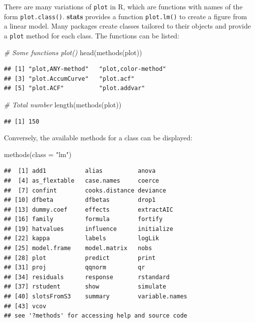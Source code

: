 \documentclass[
  12pt,
  american,
  a4paper,
  extrafontsizes,onecolumn,openright
  ]{memoir}
\newenvironment{Shaded}{\begin{snugshade}}{\end{snugshade}}
\newcommand{\AttributeTok}[1]{\textcolor[rgb]{0.77,0.63,0.00}{#1}}
\newcommand{\CommentTok}[1]{\textcolor[rgb]{0.56,0.35,0.01}{\textit{#1}}}
\newcommand{\FunctionTok}[1]{\textcolor[rgb]{0.00,0.00,0.00}{#1}}
\newcommand{\NormalTok}[1]{#1}
\newcommand{\StringTok}[1]{\textcolor[rgb]{0.31,0.60,0.02}{#1}}
\begin{document}
\normalsize

There are many variations of \texttt{plot} in R, which are functions with names of the form \texttt{plot.class()}.
\textbf{stats} provides a function \texttt{plot.lm()} to create a figure from a linear model.
Many packages create classes tailored to their objects and provide a \texttt{plot} method for each class.
The functions can be listed:

\scriptsize

\begin{Shaded}
\begin{Highlighting}[]
\CommentTok{\# Some functions plot()}
\FunctionTok{head}\NormalTok{(}\FunctionTok{methods}\NormalTok{(plot))}
\end{Highlighting}
\end{Shaded}

\begin{verbatim}
## [1] "plot,ANY-method"   "plot,color-method"
## [3] "plot.AccumCurve"   "plot.acf"         
## [5] "plot.ACF"          "plot.addvar"
\end{verbatim}

\begin{Shaded}
\begin{Highlighting}[]
\CommentTok{\# Total number}
\FunctionTok{length}\NormalTok{(}\FunctionTok{methods}\NormalTok{(plot))}
\end{Highlighting}
\end{Shaded}

\begin{verbatim}
## [1] 150
\end{verbatim}

\normalsize

Conversely, the available methods for a class can be displayed:

\scriptsize

\begin{Shaded}
\begin{Highlighting}[]
\FunctionTok{methods}\NormalTok{(}\AttributeTok{class =} \StringTok{"lm"}\NormalTok{)}
\end{Highlighting}
\end{Shaded}

\begin{verbatim}
##  [1] add1           alias          anova         
##  [4] as_flextable   case.names     coerce        
##  [7] confint        cooks.distance deviance      
## [10] dfbeta         dfbetas        drop1         
## [13] dummy.coef     effects        extractAIC    
## [16] family         formula        fortify       
## [19] hatvalues      influence      initialize    
## [22] kappa          labels         logLik        
## [25] model.frame    model.matrix   nobs          
## [28] plot           predict        print         
## [31] proj           qqnorm         qr            
## [34] residuals      response       rstandard     
## [37] rstudent       show           simulate      
## [40] slotsFromS3    summary        variable.names
## [43] vcov          
## see '?methods' for accessing help and source code
\end{verbatim}
\end{document}
